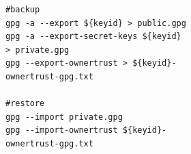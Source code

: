 \lstset{language=Python}
\begin{lstlisting}
#backup
gpg -a --export ${keyid} > public.gpg
gpg -a --export-secret-keys ${keyid} 
> private.gpg
gpg --export-ownertrust > ${keyid}-
ownertrust-gpg.txt

#restore
gpg --import private.gpg
gpg --import-ownertrust ${keyid}-
ownertrust-gpg.txt
\end{lstlisting}
